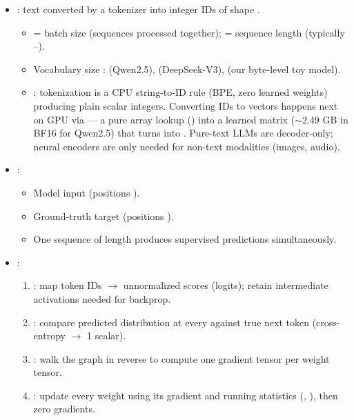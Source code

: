 \begin{itemize}
    \item {}: text converted by a tokenizer into integer IDs of shape \shape{[B, T]}.
    \begin{itemize}
        \item {} = batch size (sequences processed together);  = sequence length (typically --).
        \item Vocabulary size :  (Qwen2.5),  (DeepSeek-V3),  (our byte-level toy model).
        \item {}: tokenization is a CPU string-to-ID rule (BPE, zero learned weights) producing plain scalar integers. Converting IDs to vectors happens next on GPU via  --- a pure array lookup () into a learned \shape{[V, D]} matrix ($\sim$2.49 GB in BF16 for Qwen2.5) that turns \shape{[B, T]} into \shape{[B, T, D]}. Pure-text LLMs are decoder-only; neural encoders are only needed for non-text modalities (images, audio).
    \end{itemize}
    \item {}:
    \begin{itemize}
        \item Model input  (positions ).
        \item Ground-truth target  (positions ).
        \item One sequence of length  produces  supervised predictions simultaneously.
    \end{itemize}
    \item {}:
    \begin{enumerate}
        \item {}: map \shape{[B, T]} token IDs $\rightarrow$ \shape{[B, T, V]} unnormalized scores (logits); retain intermediate activations needed for backprop.
        \item {}: compare predicted distribution at every  against true next token  (cross-entropy $\rightarrow$ 1 scalar).
        \item {}: walk the graph in reverse to compute one gradient tensor per weight tensor.
        \item {}: update every weight using its gradient and running statistics (, ), then zero gradients.

\end{enumerate}
\end{itemize}
